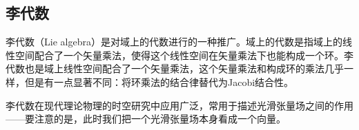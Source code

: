 

\subsection{李代数}

李代数（Lie algebra）是对域上的代数进行的一种推广。域上的代数是指域上的线性空间配合了一个矢量乘法，使得这个线性空间在矢量乘法下也能构成一个环。李代数也是域上线性空间配合了一个矢量乘法，这个矢量乘法和构成环的乘法几乎一样，但是有一点显著不同：将环乘法的结合律替代为Jacobi结合性。

李代数在现代理论物理的时空研究中应用广泛，常用于描述光滑张量场之间的作用——要注意的是，此时我们把一个光滑张量场本身看成一个向量。

